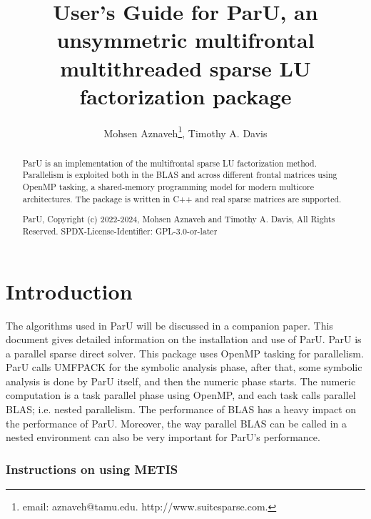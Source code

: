 \documentclass[12pt]{article}
\title{User's Guide for ParU, an unsymmetric multifrontal multithreaded sparse
LU factorization package}
\author{Mohsen Aznaveh\thanks{
email: aznaveh@tamu.edu.
http://www.suitesparse.com.
},
Timothy A. Davis}
\begin{document}
\maketitle

\begin{abstract}

ParU is an implementation of the multifrontal sparse LU factorization
method.  Parallelism is exploited both in the BLAS and across different frontal
matrices using OpenMP tasking, a shared-memory programming model for modern
multicore architectures. The package is written in C++ and real sparse matrices
are supported.

ParU, Copyright (c) 2022-2024, Mohsen Aznaveh and Timothy A. Davis,
All Rights Reserved.
SPDX-License-Identifier: GPL-3.0-or-later
\end{abstract}

\maketitle

\section{Introduction}
\label{intro}

The algorithms used in ParU will be discussed in a companion paper.
This document gives detailed information on the installation
and use of ParU.
ParU is a parallel sparse direct solver. This package uses OpenMP
tasking for parallelism. ParU calls UMFPACK for the symbolic analysis phase,
after that, some symbolic analysis is done by ParU itself, and  then the numeric
phase starts. The numeric computation is a task parallel phase using OpenMP,
and each task calls parallel BLAS; i.e. nested parallelism.
The performance of BLAS has a heavy impact on the performance of ParU. Moreover,
the way parallel BLAS can be called in a nested environment can also be very
important for ParU's performance.


\subsubsection{Instructions on using METIS}
\end{document}
